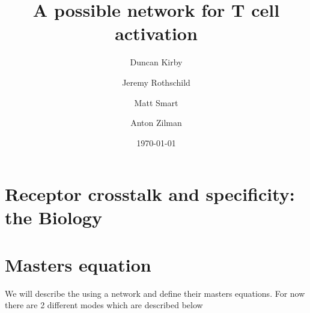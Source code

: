 \documentclass[aip, jmp, amsmath,amssymb, preprint, reprint, author-year,%
]{revtex4-1}
\begin{document}

\title[T Cell Activation]{A possible network for T cell activation}%
\author{Duncan Kirby}
\author{Jeremy Rothschild}
\author{Matt Smart}
\author{Anton Zilman}%


\date{\today}%


\maketitle



\section{\label{sec:bio}Receptor crosstalk and specificity: the Biology}


\section{\label{sec:model}Masters equation}

We will describe the using a network and define their masters equations. For now there are 2 different modes which are described below






%
\end{document}

